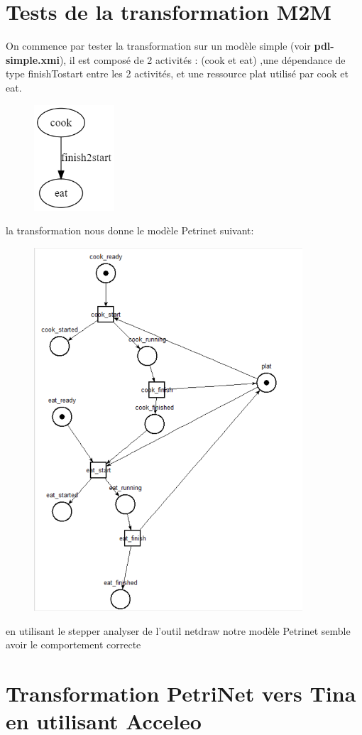 \documentclass{article}
\begin{document}
\section{Tests de la transformation M2M}
On commence par tester la transformation sur un modèle simple (voir \textbf{pdl-simple.xmi}), il est composé de 2 activités : (cook et eat)
,une dépendance de type finishTostart entre les 2 activités, et une ressource plat utilisé par cook et eat.
\begin{figure}[H]
    \centering
    \includegraphics[width = 3cm]{pdl-simple.png}
\end{figure}
la transformation nous donne le modèle Petrinet suivant:
\begin{figure}[H]
    \centering
    \includegraphics[width = 10cm]{net-simple.png}
\end{figure}
en utilisant le stepper analyser de l'outil netdraw notre modèle Petrinet semble avoir le comportement correcte
\section{Transformation PetriNet vers Tina en utilisant Acceleo}
\end{document}
